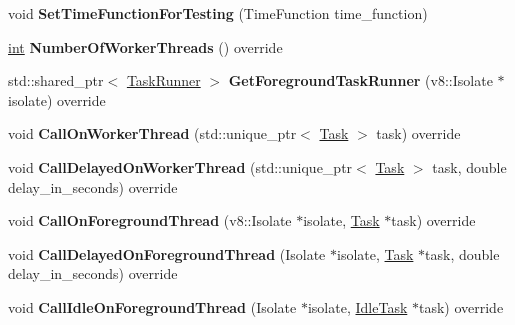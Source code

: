 \begin{DoxyCompactItemize}
void {\bfseries Set\+Time\+Function\+For\+Testing} (Time\+Function time\+\_\+function)
\item 
\mbox{\label{classv8_1_1platform_1_1DefaultPlatform_a31b2dbb9643a97ab89d763e1dfc90a9f}} 
\mbox{\hyperlink{classint}{int}} {\bfseries Number\+Of\+Worker\+Threads} () override
\item 
\mbox{\label{classv8_1_1platform_1_1DefaultPlatform_a9c8020287295fb8cdd673e09ea286c61}} 
std\+::shared\+\_\+ptr$<$ \mbox{\hyperlink{classv8_1_1TaskRunner}{Task\+Runner}} $>$ {\bfseries Get\+Foreground\+Task\+Runner} (v8\+::\+Isolate $\ast$isolate) override
\item 
\mbox{\label{classv8_1_1platform_1_1DefaultPlatform_a7def01f08f58adaa4f1fda77a93988dc}} 
void {\bfseries Call\+On\+Worker\+Thread} (std\+::unique\+\_\+ptr$<$ \mbox{\hyperlink{classv8_1_1Task}{Task}} $>$ task) override
\item 
\mbox{\label{classv8_1_1platform_1_1DefaultPlatform_a54d7b07473d95a4dcec17068f25094e6}} 
void {\bfseries Call\+Delayed\+On\+Worker\+Thread} (std\+::unique\+\_\+ptr$<$ \mbox{\hyperlink{classv8_1_1Task}{Task}} $>$ task, double delay\+\_\+in\+\_\+seconds) override
\item 
\mbox{\label{classv8_1_1platform_1_1DefaultPlatform_ac7d7fb6996ce70dced9b3ad0848c267f}} 
void {\bfseries Call\+On\+Foreground\+Thread} (v8\+::\+Isolate $\ast$isolate, \mbox{\hyperlink{classv8_1_1Task}{Task}} $\ast$task) override
\item 
\mbox{\label{classv8_1_1platform_1_1DefaultPlatform_a3dbdde1854d4b58c923359ca44de4ddc}} 
void {\bfseries Call\+Delayed\+On\+Foreground\+Thread} (Isolate $\ast$isolate, \mbox{\hyperlink{classv8_1_1Task}{Task}} $\ast$task, double delay\+\_\+in\+\_\+seconds) override
\item 
\mbox{\label{classv8_1_1platform_1_1DefaultPlatform_a7863da2c41903c325e4f33fa832e76fd}} 
void {\bfseries Call\+Idle\+On\+Foreground\+Thread} (Isolate $\ast$isolate, \mbox{\hyperlink{classv8_1_1IdleTask}{Idle\+Task}} $\ast$task) override

\end{DoxyCompactItemize}

